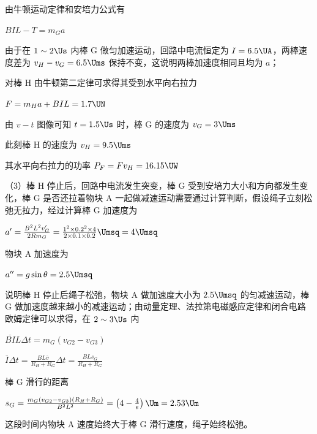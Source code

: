 \documentclass[\gkver]{gaokaozhenti}
\begin{document}
\begin{enumerate}
{由牛顿运动定律和安培力公式有

$BIL-T=m_{G}a$

由于在 $1\sim2\Us$ 内棒 G 做匀加速运动，回路中电流恒定为 $I=6.5\UA$，两棒速度差为 $v_{H}-v_{G}=6.5\Ums$ 保持不变，这说明两棒加速度相同且均为 $a$；

对棒 H 由牛顿第二定律可求得其受到水平向右拉力

$F=m_{H}a+BIL=1.7\UN$

由 $v-t$ 图像可知 $t=1.5\Us$ 时，棒 G 的速度为 $v_{G}=3\Ums$

此刻棒 H 的速度为 $v_{H}=9.5\Ums$

其水平向右拉力的功率 $P_{F}=Fv_{H}=16.15\UW$

（3）棒 H 停止后，回路中电流发生突变，棒 G 受到安培力大小和方向都发生变化，棒 G 是否还拉着物块 A 一起做减速运动需要通过计算判断，假设绳子立刻松弛无拉力，经过计算棒 G 加速度为

$a^{\prime}=\frac{B^{2}L^{2}v_{G}^{\prime}}{2Rm_{G}}=\frac{1^{2}\times0.2^{2}\times4}{2\times0.1\times0.2}\Umsq=4\Umsq$

物块 A 加速度为

$a^{\prime\prime}=g\sin\theta=2.5\Umsq$

说明棒 H 停止后绳子松弛，物块 A 做加速度大小为 $2.5\Umsq$ 的匀减速运动，棒 G 做加速度越来越小的减速运动；由动量定理、法拉第电磁感应定律和闭合电路欧姆定律可以求得，在 $2\sim3\Us$ 内

$\overline{B I}L\Delta t=m_{G}(v_{G2}-v_{G3})$

$\overline{I}\Delta t=\frac{BL\overline{v}}{R_{H}+R_{G}}\Delta t=\frac{BLs_{G}}{R_{H}+R_{G}}$

棒 G 滑行的距离

$s_{G}=\frac{m_{G}(v_{G2}-v_{G3})(R_{H}+R_{G})}{B^{2}L^{2}}=\left(4-\frac{4}{e}\right)\Um=2.53\Um$

这段时间内物块 A 速度始终大于棒 G 滑行速度，绳子始终松弛。
}

\end{enumerate}
\end{document}
